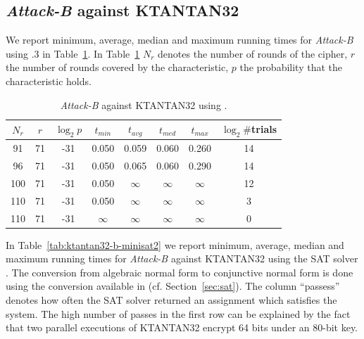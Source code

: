 \subsection{\emph{Attack-B} against KTANTAN32}

We report minimum, average, median and maximum running times for \emph{Attack-B} using .3 in Table~\ref{tab:ktantan32-b-polybori}. In Table~\ref{tab:ktantan32-b-polybori} $N_r$ denotes the number of rounds of the cipher, $r$ the number of rounds covered by the characteristic, $p$ the probability that the characteristic holds.

\begin{table}[ht]
\begin{center}
\begin{tabular}{|c|c|c|c|c|c|c|c|}
\hline
$N_r$ & $r$ & $\log_2 p$ & $t_{min}$ & $t_{avg}$ & $t_{med}$ & $t_{max}$ & $\log_2 \#$trials\\
\hline
 91 & 71 & -31 & 0.050 & 0.059 & 0.060 & 0.260 & 14\\
 96 & 71 & -31 & 0.050 & 0.065 & 0.060 & 0.290 & 14\\
100 & 71 & -31 & 0.050 & $\infty$ & $\infty$ & $\infty$ & 12\\ 
110 & 71 & -31 & 0.050 & $\infty$ & $\infty$ & $\infty$ & 3\\ 
110 & 71 & -31 & $\infty$ & $\infty$ & $\infty$ & $\infty$ & 0\\ 
\hline
\end{tabular}
\end{center}
\caption{\emph{Attack-B} against KTANTAN32 using \PolyBoRi.}
\label{tab:ktantan32-b-polybori}
\end{table}

In Table~\ref{tab:ktantan32-b-minisat2} we report minimum, average, median and maximum running times for \emph{Attack-B} against KTANTAN32 using the SAT solver \MiniSat. The conversion from algebraic normal form to conjunctive normal form is done using the conversion available in \PolyBoRi (cf. Section~\ref{sec:sat}). The column ``passess'' denotes how often the SAT solver returned an assignment which satisfies the system. The high number of passes in the first row can be explained by the fact that two parallel executions of KTANTAN32 encrypt 64 bits under an 80-bit key.

